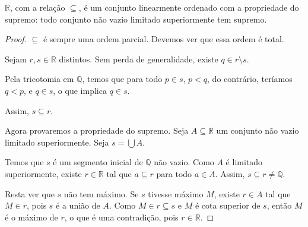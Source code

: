 \begin{proposition}
    $\mathbb R$, com a relação $\subseteq$, é um conjunto linearmente ordenado com a propriedade do supremo: todo conjunto não vazio limitado superiormente tem supremo.
\end{proposition}
\begin{proof}
    $\subseteq$ é sempre uma ordem parcial.
    Devemos ver que essa ordem é total.

    Sejam $r, s \in \mathbb R$ distintos.
    Sem perda de generalidade, existe $q\in r\setminus s$.
    
    Pela tricotomia em $\mathbb Q$, temos que para todo $p \in s$, $p<q$, do contrário, teríamos $q<p$, e $q\in s$, o que implica $q \in s$.

    Assim, $s\subseteq r$.

    Agora provaremos a propriedade do supremo.
    Seja $A\subseteq \mathbb R$ um conjunto não vazio limitado superiormente.
    Seja $s = \bigcup A$.

    Temos que $s$ é um segmento inicial de $\mathbb Q$ não vazio.
    Como $A$ é limitado superiormente, existe $r\in\mathbb R$ tal que $a\subseteq r$ para todo $a\in A$.
    Assim, $s\subseteq r\neq \mathbb Q$.

    Resta ver que $s$ não tem máximo.
    Se $s$ tivesse máximo $M$, existe $r\in A$ tal que $M\in r$, pois $s$ é a união de $A$.
    Como $M \in r\subseteq s$ e $M$ é cota superior de $s$, então $M$ é o máximo de $r$, o que é uma contradição, pois $r\in\mathbb R$.
\end{proof}

